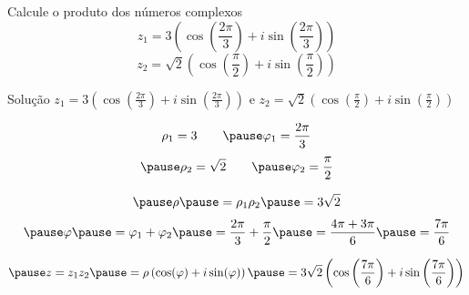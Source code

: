 \begin{question}
  Calcule o produto dos números complexos
  \[
    z_1 = 3\left(\cos\left(\frac{2\pi}{3}\right) + i\sin\left(\frac{2\pi}{3}\right)\right)
  \]
  \[
    z_2 = \sqrt{2}\left(\cos\left(\frac{\pi}{2}\right) + i\sin\left(\frac{\pi}{2}\right)\right)
  \]
\end{question}

\begin{resolution}{Solução}
  \(z_1 = 3\left(\cos\left(\frac{2\pi}{3}\right) + i\sin\left(\frac{2\pi}{3}\right)\right)\) e
  \(z_2 = \sqrt{2}\left(\cos\left(\frac{\pi}{2}\right) + i\sin\left(\frac{\pi}{2}\right)\right)\)

  \pause
  \[
    \rho_1 = 3
    \qquad
    \pause
    \varphi_1 = \frac{2\pi}{3}
  \]
  \[
    \pause
    \rho_2 = \sqrt{2}
    \qquad
    \pause
    \varphi_2 = \frac{\pi}{2}
  \]

  \[
    \pause
    \rho
    \pause
    = \rho_1 \rho_2
    \pause
    = 3\sqrt{2}
  \]
  \[
    \pause
    \varphi
    \pause
    = \varphi_1 + \varphi_2
    \pause
    = \frac{2\pi}{3} + \frac{\pi}{2}
    \pause
    = \frac{4\pi + 3\pi}{6}
    \pause
    = \frac{7\pi}{6}
  \]

  \[
    \pause
    z = z_1 z_2
    \pause
    = \rho\left(\cos(\varphi)+i\sin(\varphi)\right)
    \pause
    = 3\sqrt{2}\left(\cos\left(\frac{7\pi}{6}\right)+i\sin\left(\frac{7\pi}{6}\right)\right)
  \]
\end{resolution}

